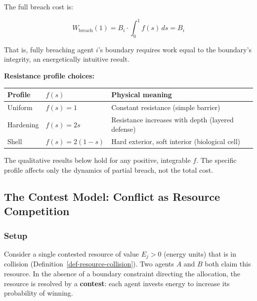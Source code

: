 \documentclass[11pt]{article}
\theoremstyle{plain}
\theoremstyle{definition}
\theoremstyle{remark}
\newcounter{none}
\let\origsubsection\subsection
\renewcommand{\subsection}{\needspace{7\baselineskip}\origsubsection}
\let\origsubsubsection\subsubsection
\renewcommand{\subsubsection}{\needspace{4\baselineskip}\origsubsubsection}
\begin{document}
The full breach cost is:

\[W_{\text{breach}}(1) = B_i \cdot \int_0^1 f(s) \, ds = B_i\]

That is, fully breaching agent \(i\)'s boundary requires work equal to
the boundary's integrity, an energetically intuitive result.

\textbf{Resistance profile choices:}

{\def\LTcaptype{none} %
\begin{longtable}[]{@{}
  >{\raggedright\arraybackslash}p{}
  >{\raggedright\arraybackslash}p{}
  >{\raggedright\arraybackslash}p{}@{}}
\toprule\noalign{}
\begin{minipage}[b]{\linewidth}\raggedright
Profile
\end{minipage} & \begin{minipage}[b]{\linewidth}\raggedright
\(f(s)\)
\end{minipage} & \begin{minipage}[b]{\linewidth}\raggedright
Physical meaning
\end{minipage} \\
\midrule\noalign{}
\endhead
\bottomrule\noalign{}
\endlastfoot
Uniform & \(f(s) = 1\) & Constant resistance (simple barrier) \\
Hardening & \(f(s) = 2s\) & Resistance increases with depth (layered
defense) \\
Shell & \(f(s) = 2(1 - s)\) & Hard exterior, soft interior (biological
cell) \\
\end{longtable}
}

The qualitative results below hold for any positive, integrable \(f\).
The specific profile affects only the dynamics of partial breach, not
the total cost.

\subsection{The Contest Model: Conflict as Resource
Competition}\label{the-contest-model-conflict-as-resource-competition}

\subsubsection{Setup}\label{setup-1}

Consider a single contested resource of value \(E_j > 0\) (energy units)
that is in collision (Definition~\ref{def-resource-collision}). Two
agents \(A\) and \(B\) both claim this resource. In the absence of a
boundary constraint directing the allocation, the resource is resolved
by a \textbf{contest}: each agent invests energy to increase its
probability of winning.
\end{document}
